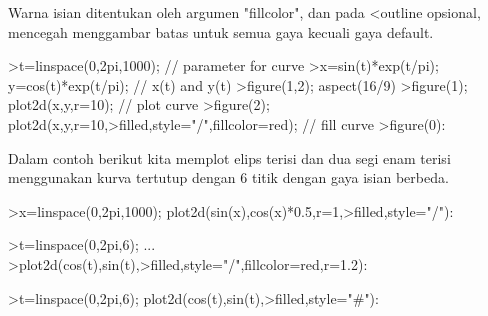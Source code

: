 \documentclass[a4paper,10pt]{article}
\begin{document}
\begin{eulernotebook}
\begin{eulercomment}
\begin{eulercomment}
\begin{eulercomment}
\begin{eulercomment}
\begin{eulercomment}
\begin{eulercomment}
\begin{eulercomment}
\begin{eulercomment}
\begin{eulercomment}
\begin{eulercomment}
\begin{eulercomment}
\begin{eulercomment}
\begin{eulercomment}
\begin{eulercomment}
\begin{eulercomment}
\begin{eulercomment}
\begin{eulercomment}
\begin{eulercomment}
\begin{eulercomment}
\begin{eulercomment}
\begin{eulercomment}
\begin{eulercomment}
\begin{eulercomment}
\begin{eulercomment}
\begin{eulercomment}
\begin{eulercomment}
\begin{eulercomment}
\begin{eulercomment}
\begin{eulercomment}
\begin{eulercomment}
\begin{eulercomment}
\begin{eulercomment}
\begin{eulercomment}
\begin{eulercomment}
\begin{eulercomment}
\begin{eulercomment}
\begin{eulercomment}
Warna isian ditentukan oleh argumen "fillcolor", dan pada \textless{}outline
opsional, mencegah menggambar batas untuk semua gaya kecuali gaya
default.
\end{eulercomment}
\begin{eulerprompt}
>t=linspace(0,2pi,1000); // parameter for curve
>x=sin(t)*exp(t/pi); y=cos(t)*exp(t/pi); // x(t) and y(t)
>figure(1,2); aspect(16/9)
>figure(1); plot2d(x,y,r=10); // plot curve
>figure(2); plot2d(x,y,r=10,>filled,style="/",fillcolor=red); // fill curve
>figure(0):
\end{eulerprompt}
\begin{eulercomment}
Dalam contoh berikut kita memplot elips terisi dan dua segi enam
terisi menggunakan kurva tertutup dengan 6 titik dengan gaya isian
berbeda.
\end{eulercomment}
\begin{eulerprompt}
>x=linspace(0,2pi,1000); plot2d(sin(x),cos(x)*0.5,r=1,>filled,style="/"):
\end{eulerprompt}
\begin{eulerprompt}
>t=linspace(0,2pi,6); ...
>plot2d(cos(t),sin(t),>filled,style="/",fillcolor=red,r=1.2):
\end{eulerprompt}
\begin{eulerprompt}
>t=linspace(0,2pi,6); plot2d(cos(t),sin(t),>filled,style="#"):
\end{eulerprompt}

\end{eulercomment}
\end{eulercomment}
\end{eulercomment}
\end{eulercomment}
\end{eulercomment}
\end{eulercomment}
\end{eulercomment}
\end{eulercomment}
\end{eulercomment}
\end{eulercomment}
\end{eulercomment}
\end{eulercomment}
\end{eulercomment}
\end{eulercomment}
\end{eulercomment}
\end{eulercomment}
\end{eulercomment}
\end{eulercomment}
\end{eulercomment}
\end{eulercomment}
\end{eulercomment}
\end{eulercomment}
\end{eulercomment}
\end{eulercomment}
\end{eulercomment}
\end{eulercomment}
\end{eulercomment}
\end{eulercomment}
\end{eulercomment}
\end{eulercomment}
\end{eulercomment}
\end{eulercomment}
\end{eulercomment}
\end{eulercomment}
\end{eulercomment}
\end{eulercomment}
\end{eulernotebook}
\end{document}

